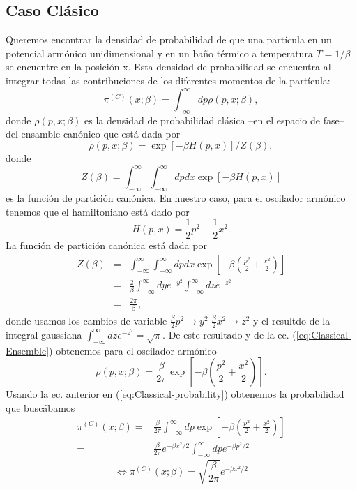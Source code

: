 \documentclass[%
 reprint,
 amsmath,amssymb,
 aps,
 pra,
]{revtex4-2}
\begin{document}
\subsection{Caso Clásico} \label{subsec:caso-clasico}
Queremos encontrar la densidad de probabilidad de que una partícula en un potencial armónico unidimensional y en un baño térmico a temperatura $T = 1/\beta$ se encuentre en la posición x. Esta densidad de probabilidad se encuentra al integrar todas las contribuciones de los diferentes momentos de la partícula:
\begin{equation}
	\pi^{(C)}(x;\beta) = \int_{-\infty}^\infty dp \rho(p,x;\beta),  \label{eq:Classical-probability}
\end{equation}
donde $\rho(p,x;\beta)$ es la densidad de probabilidad clásica –en el espacio de fase– del ensamble canónico que está dada por
\begin{equation}
	\rho(p,x;\beta) = \exp[-\beta H(p,x)] / Z(\beta) ,  \label{eq:Classical-Ensemble}
\end{equation}
donde
\begin{equation}
	Z(\beta) = \int_{-\infty}^\infty \int_{-\infty}^\infty dp dx \exp[-\beta H(p,x)]
\end{equation} 
es la función de partición canónica.
En nuestro caso, para el oscilador armónico tenemos que el hamiltoniano está dado por
\begin{equation}
	H(p,x) = \frac{1}{2} p^2 + \frac{1}{2} x^2. \label{eq:Classical-Hamiltonian}
\end{equation}
La función de partición canónica está dada por
\begin{eqnarray}
	Z(\beta) 	&=& \int_{-\infty}^\infty \int_{-\infty}^\infty dp dx \exp[-\beta \left( \frac{p^2}{2} + \frac{x^2}{2} \right) ] \\ 
				&=& \frac{2}{\beta} \int_{-\infty}^\infty dy e^{-y^2} \int_{-\infty}^\infty dz e^{-z^2} \nonumber \\
				&=& \frac{2\pi}{\beta},
\end{eqnarray}
donde usamos los cambios de variable $\frac{\beta}{2}p^2 \rightarrow y^2$ $\frac{\beta}{2}x^2 \rightarrow z^2$ y el resultdo de la integral gaussiana $\int_{-\infty}^\infty dz e^{-z^2} = \sqrt{\pi}$. De este resultado y de la ec. (\ref{eq:Classical-Ensemble}) obtenemos para el oscilador armónico
\begin{equation}
	\rho(p,x;\beta) = \frac{\beta}{2\pi} \exp[-\beta \left( \frac{p^2}{2} + \frac{x^2}{2} \right) ] \label{eq:HO-Classical-Ensemble}.
\end{equation}
Usando la ec. anterior en (\ref{eq:Classical-probability}) obtenemos la probabilidad que buscábamos 
\begin{align}
	\pi^{(C)}(x;\beta) =& \frac{\beta}{2\pi}\int_{-\infty}^\infty dp \exp[-\beta \left( \frac{p^2}{2} + \frac{x^2}{2} \right)] \nonumber \\
	=&\frac{\beta}{2\pi}e^{-\beta x^2/2}
	\int_{-\infty}^\infty dp e^{-\beta p^2/2} \nonumber
\end{align}
\begin{equation}
	\!\!\!\!\!\!\!\!\!\!\!\!\!\!\!\!\!\!\!\!\!\!\! \iff \pi^{(C)}(x;\beta) = \sqrt{\frac{\beta}{2\pi}}e^{-\beta x^2/2} \label{eq:pi-classical-finale}
\end{equation}
\end{document}
